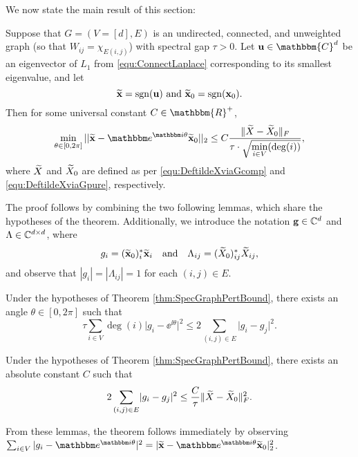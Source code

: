 We now state the main result of this section:

\begin{thm}
Suppose that $G = (V=[d], E)$ is an undirected, connected, and unweighted graph (so that $W_{ij} = \chi_{E(i, j)}$) with spectral gap $\tau > 0$.  Let ${\bf u} \in \mathbbm{C}^d$ be an eigenvector of $L_1$ from \eqref{equ:ConnectLaplace} corresponding to its smallest eigenvalue, and let \[\widetilde{\bf x} = \sgn({\bf u}) \ \text{and} \ \tx_0 = \sgn(\x_0).\] Then for some universal constant $C \in \mathbbm{R}^+$, \[\min_{\theta \in [0, 2\pi]} ||\tx - \ee^{\ii \theta} \tx_0||_2 \le C \bigfrac{\|\tX - \widetilde{\X}_0\|_F}{\tau \cdot \sqrt{\min_{i \in V}(\deg(i))}},\] where $\widetilde{X}$ and $\widetilde{X}_0$ are defined as per \eqref{equ:DeftildeXviaGcomp} and \eqref{equ:DeftildeXviaGpure}, respectively. %
\label{thm:SpecGraphPertBound}
\end{thm}

The proof follows by combining the two following lemmas, which share the hypotheses of the theorem.  Additionally, we introduce the notation ${\bf g} \in \mathbb{C}^d$ and $\Lambda \in \mathbb{C}^{d \times d}$, where $$g_i = (\widetilde{\mathbf x}_0)^*_i \widetilde{\mathbf x}_i \quad \text{and} \quad \Lambda_{ij} = (\widetilde{X}_0)^*_{ij} \widetilde{X}_{ij},$$ and observe that $|g_i| = |\Lambda_{ij}| = 1$ for each $(i, j) \in E$.

\begin{lem}
Under the hypotheses of Theorem \ref{thm:SpecGraphPertBound}, there exists an angle $\theta \in [0, 2\pi]$ such that \[\tau \sum_{i \in V} \deg(i) \lvert g_i - \ee^{\ii \theta} \rvert^2 \le 2 \sum_{(i, j) \in E} \lvert g_i - g_j \rvert^2.\]
\label{lem:gbound1}
\end{lem}

\begin{lem}
Under the hypotheses of Theorem \ref{thm:SpecGraphPertBound}, there exists an absolute constant $C$ such that \[2\sum_{(i, j) \in E} \lvert g_i - g_j \rvert^2 \le \dfrac{C}{\tau} \lVert \widetilde{X} - \widetilde{X}_0 \rVert^2_F.\]
\label{lem:gbound2}
\end{lem}

From these lemmas, the theorem follows immediately by observing $\sum_{i \in V} |g_i - \ee^{\ii \theta}|^2 = \lvert \tx - \ee^{\ii \theta} \tx_0 \rvert_2^2$.

